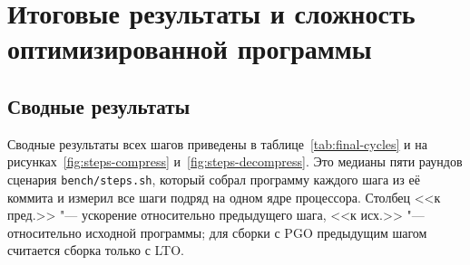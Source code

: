 \chapter{Итоговые результаты и сложность оптимизированной программы}

\section{Сводные результаты}

Сводные результаты всех шагов приведены в таблице~\ref{tab:final-cycles}
и на рисунках~\ref{fig:steps-compress} и~\ref{fig:steps-decompress}. Это
медианы пяти раундов сценария \texttt{bench/steps.sh}, который собрал
программу каждого шага из её коммита и измерил все шаги подряд на одном
ядре процессора. Столбец <<к пред.>> "--- ускорение относительно предыдущего
шага, <<к исх.>> "--- относительно исходной программы; для сборки с PGO
предыдущим шагом считается сборка только с LTO.

